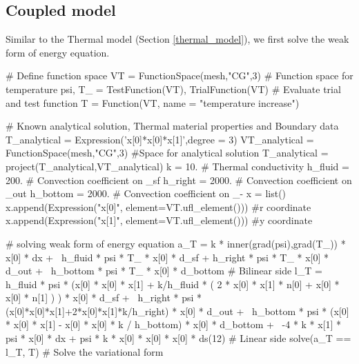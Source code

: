 \subsection{Coupled model}

Similar to the Thermal model (Section \ref{thermal_model}), we first solve the weak form of energy equation.

\begin{python}
# Define function space
VT = FunctionSpace(mesh,"CG",3) # Function space for temperature
psi, T_ = TestFunction(VT), TrialFunction(VT) # Evaluate trial and test function
T = Function(VT, name = "temperature increase")

# Known analytical solution, Thermal material properties and Boundary data
T_analytical = Expression('x[0]*x[0]*x[1]',degree = 3) 
VT_analytical = FunctionSpace(mesh,"CG",3) #Space for analytical solution
T_analytical = project(T_analytical,VT_analytical)
k = 10. # Thermal conductivity
h_fluid = 200. # Convection coefficient on \gamma_{sf}
h_right = 2000. # Convection coefficient on \gamma_{out}
h_bottom = 2000. # Convection coefficient on \gamma_{-}
x = list()
x.append(Expression("x[0]", element=VT.ufl_element())) #r coordinate
x.append(Expression("x[1]", element=VT.ufl_element())) #y coordinate

# solving weak form of energy equation
a_T = k * inner(grad(psi),grad(T_)) * x[0] * dx + \
	h_fluid * psi * T_ * x[0] * d_sf + h_right * psi * T_ * x[0] * d_out + \
	h_bottom * psi * T_ * x[0] * d_bottom # Bilinear side
l_T = h_fluid * psi * (x[0] * x[0] * x[1] + k/h_fluid * ( 2 * x[0] * x[1] * n[0] + x[0] * x[0] * n[1] ) ) * x[0] * d_sf + \
	h_right * psi * (x[0]*x[0]*x[1]+2*x[0]*x[1]*k/h_right) * x[0] * d_out + \
	h_bottom * psi * (x[0] * x[0] * x[1] - x[0] * x[0] * k / h_bottom) * x[0] * d_bottom + \
	-4 * k * x[1] * psi * x[0] * dx + psi * k * x[0] * x[0] * x[0] * ds(12) # Linear side
solve(a_T == l_T, T) # Solve the variational form
\end{python}

